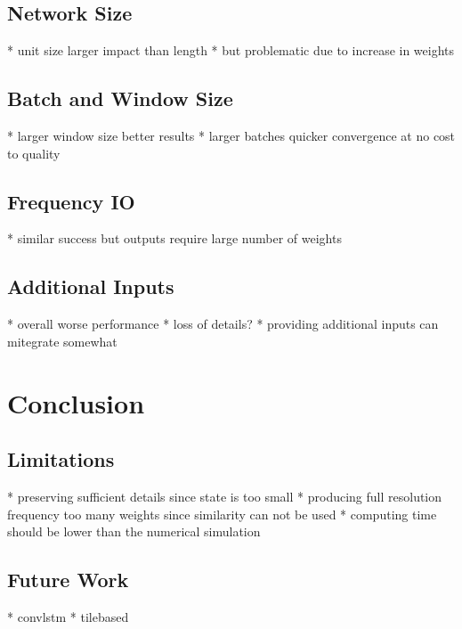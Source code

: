 \documentclass[sigconf]{acmart}
\begin{document}
\subsection{Network Size}
* unit size larger impact than length
* but problematic due to increase in weights
\subsection{Batch and Window Size}
* larger window size better results
* larger batches quicker convergence at no cost to quality
\subsection{Frequency IO}
* similar success but outputs require large number of weights
\subsection{Additional Inputs}
* overall worse performance
* loss of details?
* providing additional inputs can mitegrate somewhat
\section{Conclusion}
\subsection{Limitations}
* preserving sufficient details since state is too small
* producing full resolution frequency too many weights since similarity can not be used
* computing time should be lower than the numerical simulation
\subsection{Future Work}
* convlstm
* tilebased


%

\end{document}
